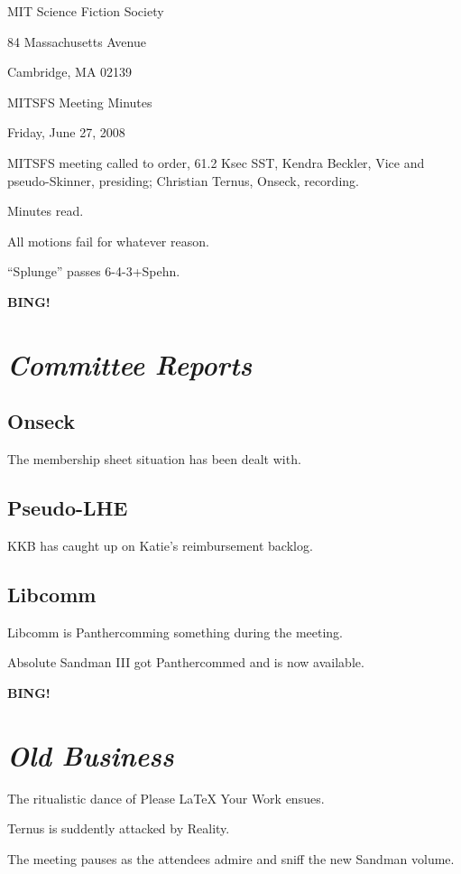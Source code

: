 \documentclass[10pt]{article}
\newcommand{\bing}{{\bf BING!} }
\newcommand{\goto}[1]{\bing \vskip 12pt \section*{{\em{#1}}}}
\begin{document}
\begin{center}

MIT Science Fiction Society

84 Massachusetts Avenue

Cambridge, MA 02139

\vspace{12pt}

MITSFS Meeting Minutes

Friday, June 27, 2008

\end{center}

\vspace{18pt}

\setlength{\parskip}{6pt}

\noindent
MITSFS meeting called to order, 61.2 Ksec SST,
Kendra Beckler, Vice and pseudo-Skinner, presiding; Christian Ternus, Onseck, recording.

Minutes read.

All motions fail for whatever reason.

``Splunge'' passes 6-4-3+Spehn.

\BING

\goto{Committee Reports}

\subsection*{Onseck}

The membership sheet situation has been dealt with.

\subsection*{Pseudo-LHE}

KKB has caught up on Katie's reimbursement backlog.

\subsection*{Libcomm}

Libcomm is Panthercomming something during the meeting.

Absolute Sandman III got Panthercommed and is now available.

\goto{Old Business}

The ritualistic dance of Please LaTeX Your Work ensues.

Ternus is suddently attacked by Reality.

The meeting pauses as the attendees admire and sniff the new Sandman
volume.
\end{document}
